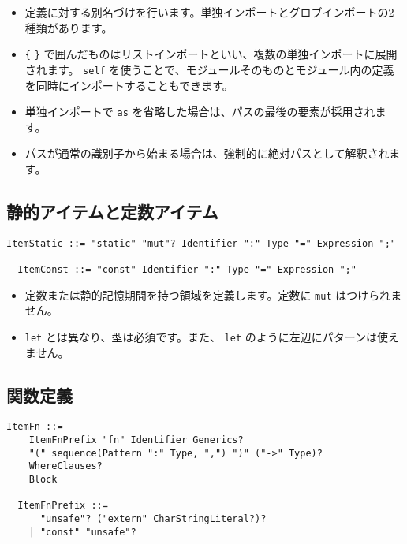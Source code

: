 \documentclass[dvipdfmx,uplatex,papersize,a4paper,10pt]{jsbook}
\theoremstyle{definition}
\begin{document}
\begin{itemize}
  \item 定義に対する別名づけを行います。単独インポートとグロブインポートの2種類があります。
  \item \verb|{| \verb|}| で囲んだものはリストインポートといい、複数の単独インポートに展開されます。 \verb|self| を使うことで、モジュールそのものとモジュール内の定義を同時にインポートすることもできます。
  \item 単独インポートで \verb|as| を省略した場合は、パスの最後の要素が採用されます。
  \item パスが通常の識別子から始まる場合は、強制的に絶対パスとして解釈されます。
\end{itemize}

\subsection{静的アイテムと定数アイテム}

\begin{lstlisting}[language=BNFLike, gobble=2]
  ItemStatic ::= "static" "mut"? Identifier ":" Type "=" Expression ";"

  ItemConst ::= "const" Identifier ":" Type "=" Expression ";"
\end{lstlisting}

\begin{itemize}
  \item 定数または静的記憶期間を持つ領域を定義します。定数に \verb|mut| はつけられません。
  \item \verb|let| とは異なり、型は必須です。また、 \verb|let| のように左辺にパターンは使えません。
\end{itemize}

\subsection{関数定義}

\begin{lstlisting}[language=BNFLike, gobble=2]
  ItemFn ::=
    ItemFnPrefix "fn" Identifier Generics?
    "(" sequence(Pattern ":" Type, ",") ")" ("->" Type)?
    WhereClauses?
    Block

  ItemFnPrefix ::=
      "unsafe"? ("extern" CharStringLiteral?)?
    | "const" "unsafe"?
\end{lstlisting}
\end{document}
